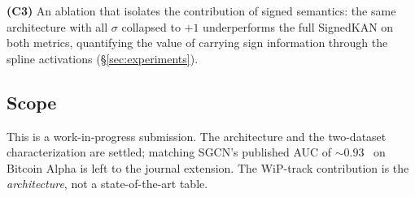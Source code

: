 \textbf{(C3)} An ablation that isolates the contribution of signed
semantics: the same architecture with all $\sigma$ collapsed to $+1$
underperforms the full SignedKAN on both metrics, quantifying the
value of carrying sign information through the spline activations
(\S\ref{sec:experiments}).

\subsection*{Scope}

This is a work-in-progress submission. The architecture and the
two-dataset characterization are settled; matching SGCN's published
AUC of $\sim 0.93$~\cite{derr2018sgcn} on Bitcoin Alpha is left to
the journal extension. The WiP-track contribution is the
\emph{architecture}, not a state-of-the-art table.

